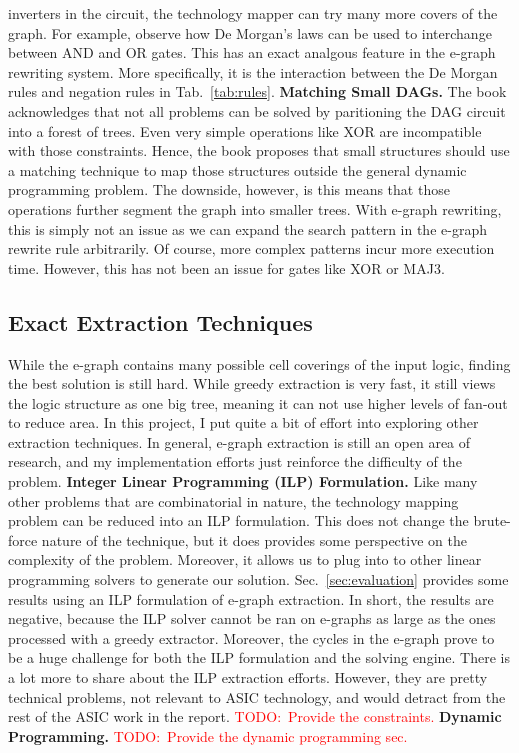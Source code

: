 \documentclass[10pt,letterpaper]{article}
\newcommand{\todo}[1]{\textcolor{red}{TODO:\ #1}}
\begin{document}
inverters in the circuit, the technology mapper can try many more covers of the
graph. For example, observe how De Morgan's laws can be used to interchange
between AND and OR gates. This has an exact analgous feature in the e-graph
rewriting system. More specifically, it is the interaction between the De
Morgan rules and negation rules in Tab.~\ref{tab:rules}. \bigbreak{} \noindent
\textbf{Matching Small DAGs.} The book acknowledges that not all problems can
be solved by paritioning the DAG circuit into a forest of trees. Even very
simple operations like XOR are incompatible with those constraints. Hence, the
book proposes that small structures should use a matching technique to map
those structures outside the general dynamic programming problem. The downside,
however, is this means that those operations further segment the graph into
smaller trees. With e-graph rewriting, this is simply not an issue as we can
expand the search pattern in the e-graph rewrite rule arbitrarily. Of course,
more complex patterns incur more execution time. However, this has not been an
issue for gates like XOR or MAJ3.

\subsection{Exact Extraction Techniques}\label{sec:alt:extraction}

While the e-graph contains many possible cell coverings of the input logic,
finding the best solution is still hard. While greedy extraction is very fast,
it still views the logic structure as one big tree, meaning it can not use
higher levels of fan-out to reduce area. In this project, I put quite a bit of
effort into exploring other extraction techniques. In general, e-graph
extraction is still an open area of research, and my implementation efforts
just reinforce the difficulty of the problem. \bigbreak{} \noindent
\textbf{Integer Linear Programming (ILP) Formulation.} Like many other problems
that are combinatorial in nature, the technology mapping problem can be reduced
into an ILP formulation. This does not change the brute-force nature of the
technique, but it does provides some perspective on the complexity of the
problem. Moreover, it allows us to plug into to other linear programming
solvers to generate our solution. Sec.~\ref{sec:evaluation} provides some
results using an ILP formulation of e-graph extraction. In short, the results
are negative, because the ILP solver cannot be ran on e-graphs as large as the
ones processed with a greedy extractor. Moreover, the cycles in the e-graph
prove to be a huge challenge for both the ILP formulation and the solving
engine. There is a lot more to share about the ILP extraction efforts. However,
they are pretty technical problems, not relevant to ASIC technology, and would
detract from the rest of the ASIC work in the report. \todo{Provide the
    constraints.} \bigbreak{} \noindent \textbf{Dynamic Programming.} \todo{Provide
    the dynamic programming sec.}
\end{document}
